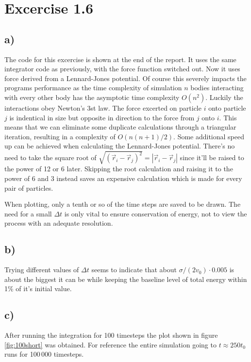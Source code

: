 \documentclass[a4paper, 12pt]{article}
\begin{document}
\section*{Excercise 1.6}

\subsection*{a)}
The code for this excercise is shown at the end of the report. It uses the same integrator code as previously, with the force function switched out. Now it uses force derived from a Lennard-Jones potential. Of course this severely impacts the programs performance as the time complexity of simulation $n$ bodies interacting with every other body has the asymptotic time complexity $O(n^2)$. Luckily the interactions obey Newton's 3st law. The force excerted on particle $i$ onto particle $j$ is indentical in size but opposite in direction to the force from $j$ onto $i$. This means that we can eliminate some duplicate calculations through a triangular iteration, resulting in a complexity of $O(n(n+1)/2)$. Some additional speed up can be achieved when calculating the Lennard-Jones potential. There's no need to take the square root of $\sqrt{(\vec{r}_i - \vec{r}_j)^2} = |\vec{r}_i - \vec{r}_j|$ since it'll be raised to the power of 12 or 6 later. Skipping the root calculation and raising it to the power of 6 and 3 instead saves an expensive calculation which is made for every pair of particles.

When plotting, only a tenth or so of the time steps are saved to be drawn. The need for a small $\Delta t$ is only vital to ensure conservation of energy, not to view the process with an adequate resolution.

\subsection*{b)}
Trying different values of $\Delta t$ seems to indicate that about $\sigma/(2v_0) \cdot 0.005$ is about the biggest it can be while keeping the baseline level of total energy within 1\% of it's initial value.

\newpage

\subsection*{c)}
After running the integration for 100 timesteps the plot shown in figure \ref{fig:100short} was obtained. For reference the entire simulation going to $t \approx 250 t_0$ runs for 100\,000 timesteps.
\end{document}
